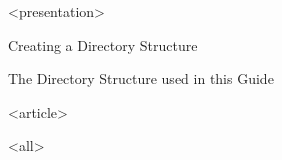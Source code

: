 \mode
<presentation>

\begin{frame}{Creating a Directory Structure}
  \label{start:folders}

  \begin{block}{The Directory Structure used in this Guide}
  \end{block}

\end{frame}


\mode
<article>

\bigskip


\clearpage

\mode
<all>

